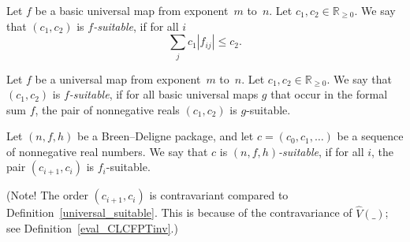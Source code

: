 \begin{definition}
  \label{basic_suitable}
  \leanok
  Let $f$ be a basic universal map from exponent~$m$ to~$n$.
  Let $c_1, c_2 \in \mathbb R_{\ge 0}$.
  We say that $(c_1, c_2)$ is \emph{$f$-suitable}, if for all $i$
  \[
    \sum_j c_1|f_{ij}| \le c_2.
  \]
\end{definition}

\begin{definition}
  \label{universal_suitable}
  \leanok
  Let $f$ be a universal map from exponent~$m$ to~$n$.
  Let $c_1, c_2 \in \mathbb R_{\ge 0}$.
  We say that $(c_1, c_2)$ is \emph{$f$-suitable}, if for all basic universal maps $g$
  that occur in the formal sum $f$,
  the pair of nonnegative reals $(c_1, c_2)$ is $g$-suitable.
\end{definition}

\begin{definition}
  \label{BD_suitable}
  \leanok
  Let $(n, f, h)$ be a Breen--Deligne package,
  and let $c = (c_0, c_1, \dots)$ be a sequence of nonnegative real numbers.
  We say that $c$ is \emph{$(n,f,h)$-suitable},
  if for all $i$, the pair $(c_{i+1}, c_i)$ is $f_i$-suitable.

  (Note! The order $(c_{i+1}, c_i)$ is contravariant
  compared to Definition~\ref{universal_suitable}.
  This is because of the contravariance of $\hat V(\_)$;
  see Definition~\ref{eval_CLCFPTinv}.)
\end{definition}

